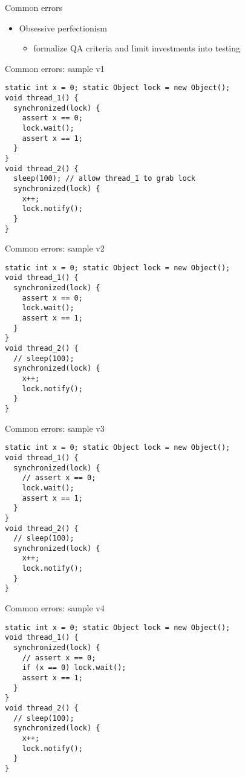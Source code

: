 \begin{frame}{Common errors}
\begin{itemize}
  \pause
  \item Obsessive perfectionism
  \begin{itemize}
    \item formalize QA criteria and limit investments into testing
  \end{itemize}

\end{itemize}
\end{frame}


\begin{frame}[fragile]{Common errors: sample v1}

\begin{verbatim}
static int x = 0; static Object lock = new Object();
void thread_1() {
  synchronized(lock) {
    assert x == 0;
    lock.wait();
    assert x == 1;
  }
}
void thread_2() {
  sleep(100); // allow thread_1 to grab lock
  synchronized(lock) {
    x++;
    lock.notify();
  }
}
\end{verbatim}
\end{frame}

\begin{frame}{Common errors: sample v2}

\begin{verbatim}
static int x = 0; static Object lock = new Object();
void thread_1() {
  synchronized(lock) {
    assert x == 0;
    lock.wait();
    assert x == 1;
  }
}
void thread_2() {
  // sleep(100);
  synchronized(lock) {
    x++;
    lock.notify();
  }
}
\end{verbatim}
\end{frame}

\begin{frame}{Common errors: sample v3}

\begin{verbatim}
static int x = 0; static Object lock = new Object();
void thread_1() {
  synchronized(lock) {
    // assert x == 0;
    lock.wait();
    assert x == 1;
  }
}
void thread_2() {
  // sleep(100);
  synchronized(lock) {
    x++;
    lock.notify();
  }
}
\end{verbatim}
\end{frame}

\begin{frame}{Common errors: sample v4}

\begin{verbatim}
static int x = 0; static Object lock = new Object();
void thread_1() {
  synchronized(lock) {
    // assert x == 0;
    if (x == 0) lock.wait();
    assert x == 1;
  }
}
void thread_2() {
  // sleep(100);
  synchronized(lock) {
    x++;
    lock.notify();
  }
}
\end{verbatim}
\end{frame}

